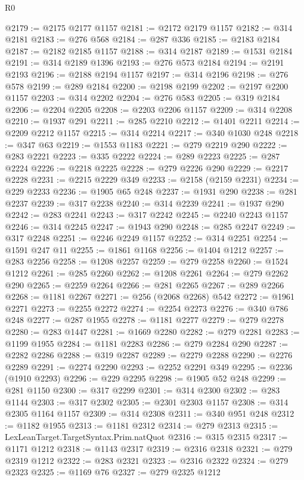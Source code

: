 \begin{lexlean}{R0}
\begin{coremodule}
@2179 := @2175 @2177 @1157
@2181 := @2172 @2179 @1157
@2182 := @314 @2181
@2183 := @276 @568
@2184 := @287 @336
@2185 := @2183 @2184
@2187 := @2182 @2185 @1157
@2188 := @314 @2187
@2189 := @1531 @2184
@2191 := @314 @2189 @1396
@2193 := @276 @573 @2184
@2194 := @2191 @2193
@2196 := @2188 @2194 @1157
@2197 := @314 @2196
@2198 := @276 @578
@2199 := @289 @2184
@2200 := @2198 @2199
@2202 := @2197 @2200 @1157
@2203 := @314 @2202
@2204 := @276 @583
@2205 := @319 @2184
@2206 := @2204 @2205
@2208 := @2203 @2206 @1157
@2209 := @314 @2208
@2210 := @1937 @291
@2211 := @285 @2210
@2212 := @1401 @2211
@2214 := @2209 @2212 @1157
@2215 := @314 @2214
@2217 := @340 @1030 @248
@2218 := @347 @63
@2219 := @1553 @1183
@2221 := @279 @2219 @290
@2222 := @283 @2221
@2223 := @335 @2222
@2224 := @289 @2223
@2225 := @287 @2224
@2226 := @2218 @2225
@2228 := @279 @2226 @290
@2229 := @2217 @2228
@2231 := @2215 @2229 @349
@2233 := @2158 (@2159 @2231)
@2234 := @229 @2233
@2236 := @1905 @65 @248
@2237 := @1931 @290
@2238 := @281 @2237
@2239 := @317 @2238
@2240 := @314 @2239
@2241 := @1937 @290
@2242 := @283 @2241
@2243 := @317 @2242
@2245 := @2240 @2243 @1157
@2246 := @314 @2245
@2247 := @1943 @290
@2248 := @285 @2247
@2249 := @317 @2248
@2251 := @2246 @2249 @1157
@2252 := @314 @2251
@2254 := @1591 @247 @11
@2255 := @1861 @1168
@2256 := @1404 @1212
@2257 := @283 @2256
@2258 := @1208 @2257
@2259 := @279 @2258
@2260 := @1524 @1212
@2261 := @285 @2260
@2262 := @1208 @2261
@2264 := @279 @2262 @290
@2265 := @2259 @2264
@2266 := @281 @2265
@2267 := @289 @2266
@2268 := @1181 @2267
@2271 := @256 (@2068 @2268) @542
@2272 := @1961 @2271
@2273 := @2255 @2272
@2274 := @2254 @2273
@2276 := @340 @786 @248
@2277 := @287 @1955
@2278 := @1181 @2277
@2279 := @279 @2278
@2280 := @283 @1447
@2281 := @1669 @2280
@2282 := @279 @2281
@2283 := @1199 @1955
@2284 := @1181 @2283
@2286 := @279 @2284 @290
@2287 := @2282 @2286
@2288 := @319 @2287
@2289 := @2279 @2288
@2290 := @2276 @2289
@2291 := @2274 @2290
@2293 := @2252 @2291 @349
@2295 := @2236 (@1910 @2293)
@2296 := @229 @2295
@2298 := @1905 @52 @248
@2299 := @281 @1150
@2300 := @317 @2299
@2301 := @314 @2300
@2302 := @283 @1144
@2303 := @317 @2302
@2305 := @2301 @2303 @1157
@2308 := @314 @2305 @1164 @1157
@2309 := @314 @2308
@2311 := @340 @951 @248
@2312 := @1182 @1955
@2313 := @1181 @2312
@2314 := @279 @2313
@2315 := LexLeanTarget.TargetSyntax.Prim.natQuot
@2316 := @315 @2315
@2317 := @1171 @1212
@2318 := @1143 @2317
@2319 := @2316 @2318
@2321 := @279 @2319 @1212
@2322 := @283 @2321
@2323 := @2316 @2322
@2324 := @279 @2323
@2325 := @1169 @76
@2327 := @279 @2325 @1212

\end{coremodule}
\end{lexlean}
